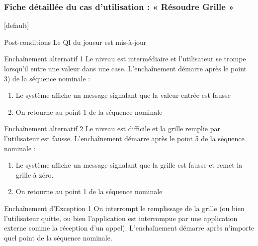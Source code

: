 \documentclass{beamer}
\begin{document}
\begin{frame}
\frametitle{Fiche détaillée du cas d'utilisation : « Résoudre Grille »}
[default]
  \begin{block}{\footnotesize{Post-conditions}}
    \scriptsize{Le QI du joueur est mis-à-jour}
  \end{block}
  \pause
  \begin{block}{\footnotesize{Enchaînement alternatif 1}}
    \scriptsize{Le niveau est intermédiaire et l’utilisateur se trompe lorsqu’il entre une valeur dans une case.
    L’enchaînement démarre après le point 3) de la séquence nominale :}
    \begin{enumerate}    
      [circle]
    \item
      \scriptsize{Le système affiche un message signalant que la valeur entrée est fausse}
    \item
      \scriptsize{On retourne au point 1 de la séquence nominale}
    \end{enumerate}
  \end{block}
  \pause
  \begin{block}{\footnotesize{Enchaînement alternatif 2}}
    \scriptsize{Le niveau est difficile et la grille remplie par l’utilisateur est fausse.
    L’enchaînement démarre après le point 5 de la séquence nominale :}
    \begin{enumerate}    
      [circle]
    \item
      \scriptsize{Le système affiche un message signalant que la grille est fausse et remet la grille à zéro.}
    \item
      \scriptsize{On retourne au point 1 de la séquence nominale}
    \end{enumerate}
  \end{block}
  \pause
  \begin{block}{\footnotesize{Enchaînement d’Exception 1}}
    \scriptsize{On interrompt le remplissage de la grille (ou bien l’utilisateur quitte, ou bien l’application est interrompue par une application externe comme la réception d’un appel).
L’enchaînement démarre après n’importe quel point de la séquence nominale.}
  \end{block}
\end{frame}
\end{document}
